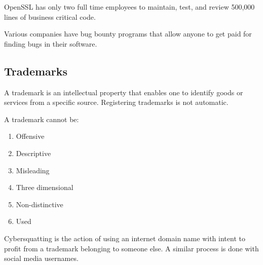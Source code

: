OpenSSL has only two full time employees to maintain, test, and review 500,000 lines of business critical code.

Various companies have bug bounty programs that allow anyone to get paid for finding bugs in their software.

\subsection{Trademarks}
A trademark is an intellectual property that enables one to identify goods or services from a specific source. Registering trademarks is not automatic.

A trademark cannot be:
\begin{enumerate}
    \item Offensive
    \item Descriptive
    \item Misleading
    \item Three dimensional
    \item Non-distinctive
    \item Used
\end{enumerate}
Cybersquatting is the action of using an internet domain name with intent to profit from a trademark belonging to someone else. A similar process is done with social media usernames.

